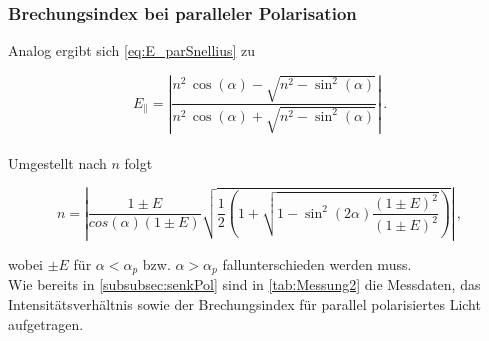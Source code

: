\subsubsection{Brechungsindex bei paralleler Polarisation}

Analog ergibt sich \eqref{eq:E_parSnellius} zu

\begin{equation*}
    E_\parallel = \left| \frac{n^2 \, \cos(\alpha) - \sqrt{n^2 - \sin^2(\alpha)}}{n^2 \, \cos(\alpha) + \sqrt{n^2 - \sin^2(\alpha)}} \right| \,.
\end{equation*} \\

Umgestellt nach $n$ folgt

\begin{equation*}
    n  = \left| \frac{1 \pm E}{cos(\alpha) (1 \pm E)} \sqrt{\frac{1}{2} 
    \left(1 + \sqrt{1 - \sin^2(2 \alpha) \frac{(1 \pm E)^2}{(1 \pm E)^2}} \right)} \right| \,,
\end{equation*}

wobei $\pm E$ für $\alpha < \alpha_p$ bzw. $\alpha > \alpha_p$ fallunterschieden werden muss. \\

Wie bereits in \autoref{subsubsec:senkPol} sind in \autoref{tab:Messung2} die Messdaten, das Intensitätsverhältnis sowie der Brechungsindex für parallel polarisiertes Licht aufgetragen.

